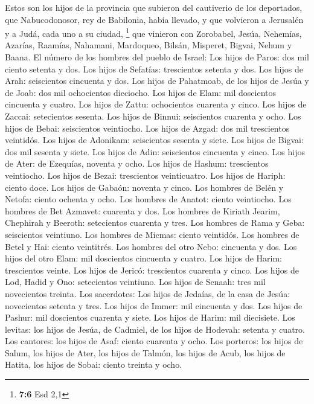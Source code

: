  Estos son los hijos de la provincia que subieron del
cautiverio de los deportados, que Nabucodonosor, rey de Babilonia, había
llevado, y que volvieron a Jerusalén y a Judá, cada uno a su ciudad,
\footnote{\textbf{7:6} Esd 2,1}  que vinieron con
Zorobabel, Jesúa, Nehemías, Azarías, Raamías, Nahamani, Mardoqueo,
Bilsán, Misperet, Bigvai, Nehum y Baana. El número de los hombres del
pueblo de Israel:  Los hijos de Paros: dos mil ciento
setenta y dos.  Los hijos de Sefatías: trescientos setenta
y dos.  Los hijos de Arah: seiscientos cincuenta y dos.
 Los hijos de Pahatmoab, de los hijos de Jesúa y de Joab:
dos mil ochocientos dieciocho.  Los hijos de Elam: mil
doscientos cincuenta y cuatro.  Los hijos de Zattu:
ochocientos cuarenta y cinco.  Los hijos de Zaccai:
setecientos sesenta.  Los hijos de Binnui: seiscientos
cuarenta y ocho.  Los hijos de Bebai: seiscientos
veintiocho.  Los hijos de Azgad: dos mil trescientos
veintidós.  Los hijos de Adonikam: seiscientos sesenta y
siete.  Los hijos de Bigvai: dos mil sesenta y siete.
 Los hijos de Adin: seiscientos cincuenta y cinco.
 Los hijos de Ater: de Ezequías, noventa y ocho.
 Los hijos de Hashum: trescientos veintiocho.
 Los hijos de Bezai: trescientos veinticuatro.
 Los hijos de Hariph: ciento doce.  Los
hijos de Gabaón: noventa y cinco.  Los hombres de Belén y
Netofa: ciento ochenta y ocho.  Los hombres de Anatot:
ciento veintiocho.  Los hombres de Bet Azmavet: cuarenta
y dos.  Los hombres de Kiriath Jearim, Chephirah y
Beeroth: setecientos cuarenta y tres.  Los hombres de
Rama y Geba: seiscientos veintiuno.  Los hombres de
Micmas: ciento veintidós.  Los hombres de Betel y Hai:
ciento veintitrés.  Los hombres del otro Nebo: cincuenta
y dos.  Los hijos del otro Elam: mil doscientos cincuenta
y cuatro.  Los hijos de Harim: trescientos veinte.
 Los hijos de Jericó: trescientos cuarenta y cinco.
 Los hijos de Lod, Hadid y Ono: setecientos veintiuno.
 Los hijos de Senaah: tres mil novecientos treinta.
 Los sacerdotes: Los hijos de Jedaías, de la casa de
Jesúa: novecientos setenta y tres.  Los hijos de Immer:
mil cincuenta y dos.  Los hijos de Pashur: mil doscientos
cuarenta y siete.  Los hijos de Harim: mil diecisiete.
 Los levitas: los hijos de Jesúa, de Cadmiel, de los
hijos de Hodevah: setenta y cuatro.  Los cantores: los
hijos de Asaf: ciento cuarenta y ocho.  Los porteros: los
hijos de Salum, los hijos de Ater, los hijos de Talmón, los hijos de
Acub, los hijos de Hatita, los hijos de Sobai: ciento treinta y ocho.

